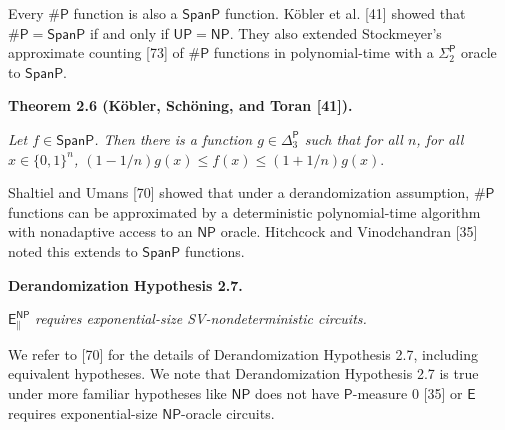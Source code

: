 \documentclass[10pt,a4paper]{article}
\begin{document}
Every ${\mathsf{\#}\mathsf{P}}$ function is also a $\mathsf{SpanP}$ function. Köbler et al. [41] showed that ${\mathsf{\#}\mathsf{P}}=\mathsf{SpanP}$ if and only if $\mathsf{UP}=\mathsf{NP}$.
They also extended Stockmeyer’s approximate counting [73] of ${\mathsf{\#}\mathsf{P}}$ functions in polynomial-time with a $\Sigma^{\mathsf{P}}_{2}$ oracle to $\mathsf{SpanP}$.\par





\par\medskip\noindent\textbf{
\textbf{Theorem 2.6}\textbf{ }(Köbler, Schöning, and Toran [41])\textbf{.}
}\par



\emph{Let $f\in\mathsf{SpanP}$. Then there is
a function $g\in{\Delta^{\mathsf{P}}_{3}}$ such that for all $n$, for all $x\in\{0,1\}^{n}$,
$(1-1/n)g(x)\leq f(x)\leq(1+1/n)g(x).$}\par






Shaltiel and Umans [70] showed that under a derandomization
assumption, ${\mathsf{\#}\mathsf{P}}$ functions can be approximated by a deterministic
polynomial-time algorithm with nonadaptive access to an $\mathsf{NP}$ oracle. Hitchcock and Vinodchandran [35] noted this extends to $\mathsf{SpanP}$ functions.\par





\par\medskip\noindent\textbf{
\textbf{Derandomization Hypothesis 2.7}\textbf{.}
}\par



$\mathsf{E}^{\mathsf{NP}}_{\parallel}$\emph{ requires exponential-size SV-nondeterministic circuits.}\par






We refer to [70] for the details of Derandomization Hypothesis 2.7, including equivalent hypotheses. We note that Derandomization Hypothesis 2.7 is true under more familiar hypotheses like $\mathsf{NP}$ does not have $\mathsf{P}$-measure 0 [35] or $\mathsf{E}$ requires exponential-size $\mathsf{NP}$-oracle circuits.\par
\end{document}
